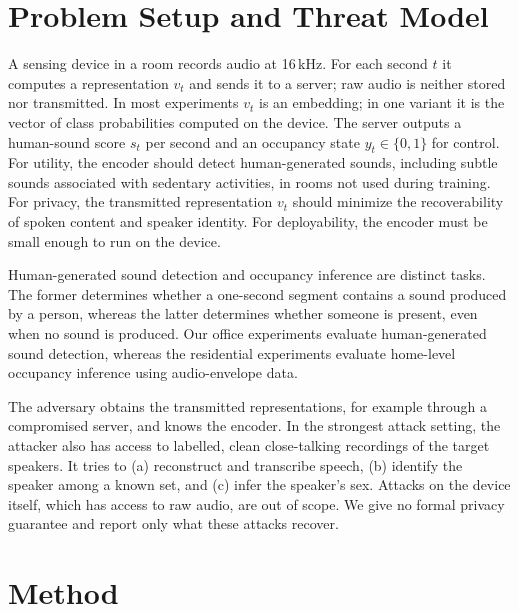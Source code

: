 \documentclass[11pt]{article}
\begin{document}
\section{Problem Setup and Threat Model}
\label{sec:setup-threat}

A sensing device in a room records audio at 16\,kHz. For each second $t$ it computes a representation $v_t$ and sends it to a server; raw audio is neither stored nor transmitted. In most experiments $v_t$ is an embedding; in one variant it is the vector of class probabilities computed on the device. The server outputs a human-sound score $s_t$ per second and an occupancy state $y_t \in \{0,1\}$ for control. For utility, the encoder should detect human-generated sounds, including subtle sounds associated with sedentary activities, in rooms not used during training. For privacy, the transmitted representation $v_t$ should minimize the recoverability of spoken content and speaker identity. For deployability, the encoder must be small enough to run on the device.

Human-generated sound detection and occupancy inference are distinct tasks. The former determines whether a one-second segment contains a sound produced by a person, whereas the latter determines whether someone is present, even when no sound is produced. Our office experiments evaluate human-generated sound detection, whereas the residential experiments evaluate home-level occupancy inference using audio-envelope data.

The adversary obtains the transmitted representations, for example through a compromised server, and knows the encoder. In the strongest attack setting, the attacker also has access to labelled, clean close-talking recordings of the target speakers. It tries to (a) reconstruct and transcribe speech, (b) identify the speaker among a known set, and (c) infer the speaker's sex. Attacks on the device itself, which has access to raw audio, are out of scope. We give no formal privacy guarantee and report only what these attacks recover.

\section{Method}
\label{sec:method}
\end{document}
